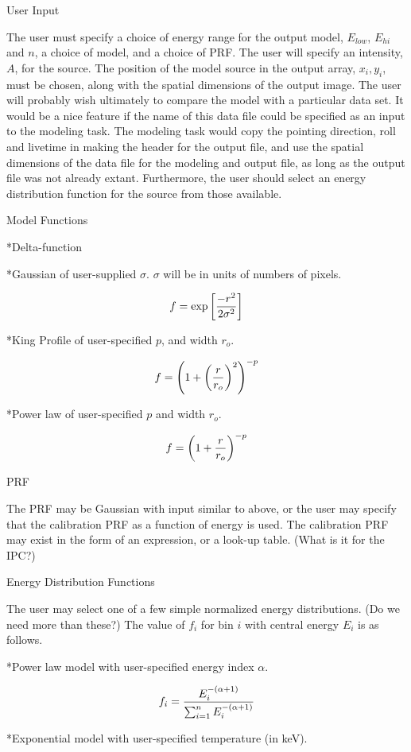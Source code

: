 \@{User Input}

The user must specify a choice of energy range for the output model,
$E_{low}$, $E_{hi}$ and $n$, a
choice of model, and a choice of PRF.  The user will specify an
intensity, $A$, for the source.  The position of the model
source in the output array, $x_i, y_i$, must be
chosen, along with the spatial dimensions of the output image.
The user will probably wish ultimately to compare the model with
a particular data set.  It would be a nice feature if the
name of this data file could be specified as an input to the modeling
task.  The modeling task would
copy the pointing direction, roll and
livetime in making the header for the output file, and use the spatial
dimensions of the data file for the modeling and output file, as long as the
output file was not already extant.
Furthermore, the user should select an energy
distribution function for the source from those available.

\@{Model Functions}

\**Delta-function

\**Gaussian of user-supplied $\sigma$.  $\sigma$ will be
in units of numbers of pixels. 

$$f =  \exp {\left[ - r^2 \over 2 \sigma^2\right]}$$

\**King Profile of user-specified $p$, and width $r_o$.

$$f =  \left( 1 + \left({r \over r_o}\right)^2 \right)^{-p}$$

\**Power law of user-specified $p$ and width $r_o$.

$$f =  \left( 1 + {r \over r_o} \right)^{-p}$$

\@{PRF}

The PRF may be Gaussian with input similar to above, or the user may
specify that the calibration PRF as a function of energy is
used.  The calibration PRF may exist in the form of an expression, or
a look-up table. (What is it for the IPC?)

\@{Energy Distribution Functions}

The user may select one of a few simple normalized energy
distributions. (Do we need more than these?)  The value of $f_i$ for
bin $i$ with central energy $E_i$ is as follows.

\**Power law model with user-specified energy index $\alpha$.

$$f_i = {E_i ^{-(\alpha + 1)} \over \sum_{i=1}^n E_i ^{-(\alpha + 1)}}  $$

\**Exponential model with user-specified temperature (in keV).

